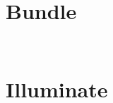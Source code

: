 \chapter{Bundle}

\begin{lstlisting}[language=PHP]

\end{lstlisting}



\begin{lstlisting}[language=PHP]

\end{lstlisting}


\chapter{Illuminate}

\begin{lstlisting}[language=PHP]

\end{lstlisting}



\begin{lstlisting}[language=PHP]

\end{lstlisting}




\begin{lstlisting}[language=PHP]

\end{lstlisting}




\begin{lstlisting}[language=PHP]

\end{lstlisting}




\begin{lstlisting}[language=PHP]

\end{lstlisting}



\begin{lstlisting}[language=PHP]

\end{lstlisting}




\begin{lstlisting}[language=PHP]

\end{lstlisting}



